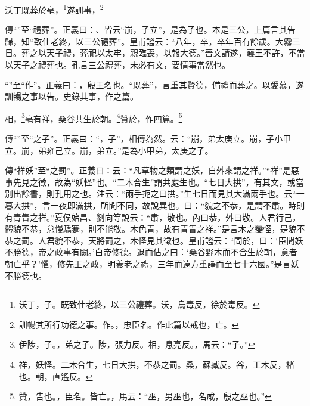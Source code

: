 沃丁既葬於亳，\footnote{沃丁，子。既致仕老終，以三公禮葬。沃，烏毒反，徐於毒反。}遂訓事，\footnote{訓暢其所行功德之事。作。，忠臣名。作此篇以戒也，亡。}

{\noindent\zhuan{}\fzbyks 傳“”至“禮葬”。正義曰：、皆云“崩，子立”，是為子也。本是三公，上篇言其告歸，知“致仕老終，以三公禮葬”。皇甫謐云：“八年，卒，卒年百有餘歲。大霧三日。葬之以天子禮，葬祀以太牢，親臨喪，以報大德。”晉文請遂，襄王不許，不當以天子之禮葬也。孔言三公禮葬，未必有文，要情事當然也。 \par}

{\noindent\shu{}\fzkt “”至“作”。正義曰：，殷王名也。“既葬”，言重其賢德，備禮而葬之。以愛慕，遂訓暢之事以告。史錄其事，作之篇。 \par}

相，\footnote{伊陟，子。，弟之子。陟，張力反。相，息亮反。，馬云：“子。”}亳有祥，桑谷共生於朝。\footnote{祥，妖怪。二木合生，七日大拱，不恭之罰。桑，蘇臧反。谷，工木反，楮也。朝，直遙反。}贊於，作四篇。\footnote{贊，告也。，臣名。皆亡。，馬云：“巫，男巫也，名咸，殷之巫也。”}

{\noindent\zhuan{}\fzbyks 傳“”至“之子”。正義曰：“，子”，相傳為然。云：“崩，弟太庚立。崩，子小甲立。崩，弟雍己立。崩，弟立。”是為小甲弟，太庚之子。 \par}

{\noindent\zhuan{}\fzbyks 傳“祥妖”至“之罰”。正義曰：云：“凡草物之類謂之妖，自外來謂之祥。”“祥”是惡事先見之徵，故為“妖怪”也。“二木合生”謂共處生也。“七日大拱”，有其文，或當別出餘書，則孔用之也。注云：“兩手扼之曰拱。”生七日而見其大滿兩手也。云“一暮大拱”，言一夜即滿拱，所聞不同，故說異也。曰：“貌之不恭，是謂不肅。時則有青眚之祥。”夏侯始昌、劉向等說云：“肅，敬也。內曰恭，外曰敬。人君行己，體貌不恭，怠慢驕蹇，則不能敬。木色青，故有青眚之祥。”是言木之變怪，是貌不恭之罰。人君貌不恭，天將罰之，木怪見其徵也。皇甫謐云：“問於，曰：‘臣聞妖不勝德，帝之政事有闕。’白帝修德。退而佔之曰：‘桑谷野木而不合生於朝，意者朝亡乎？’懼，修先王之政，明養老之禮，三年而遠方重譯而至七十六國。”是言妖不勝德也。 \par}

